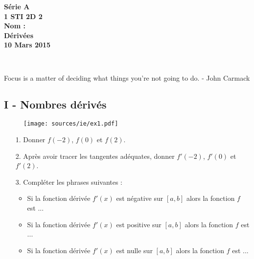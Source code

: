 \documentclass[12pt]{article}
\begin{document}

\begin{minipage}[t]{\textwidth}
  \raggedright
      {\bfseries Série A}\\[.35ex]
      {\bfseries 1 STI 2D 2}\\[.35ex]
      {\bfseries Nom : }\\[.35ex]
      \vspace*{-1cm}
      \raggedleft
          {\bfseries Dérivées}\\[.35ex]
          {\bfseries 10 Mars 2015}\\[.35ex]
\end{minipage}\\[1em]

\begin{center}
  \textsf{Focus is a matter of deciding what things you're not going to do. - John Carmack}\\
\end{center}

\setlength{\columnseprule}{1pt}

\subsection*{I - Nombres dérivés}


\begin{figure}[H]
  \centering
  \texttt{[image: sources/ie/ex1.pdf]}
\end{figure}

\begin{enumerate}
\item[1.] Donner $f(-2)$, $f(0)$ et $f(2)$.
\item[2.] Après avoir tracer les tangentes adéquates, donner $f'(-2)$, $f'(0)$ et $f'(2)$.
\item[3.] Compléter les phrases suivantes :
  \begin{itemize}
  \item Si la fonction dérivée $f'(x)$ est négative sur $[a, b]$ alors la fonction $f$ est ...
  \item Si la fonction dérivée $f'(x)$ est positive sur $[a, b]$ alors la fonction $f$ est ...
  \item Si la fonction dérivée $f'(x)$ est nulle sur $[a, b]$ alors la fonction $f$ est ...
  \end{itemize}
\end{enumerate}
\end{document}
